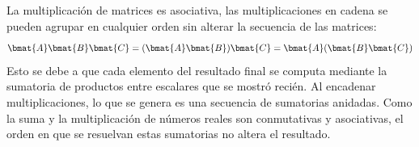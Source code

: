 La multiplicación de matrices es asociativa, las multiplicaciones en cadena se pueden agrupar en cualquier orden sin alterar la secuencia de las matrices:
\[\bmat{A}  \bmat{B}  \bmat{C} = (\bmat{A}  \bmat{B})  \bmat{C} = \bmat{A}  (\bmat{B}  \bmat{C})\]
Esto se debe a que cada elemento del resultado final se computa mediante la sumatoria de productos entre escalares que se mostró recién. Al encadenar multiplicaciones, lo que se genera es una secuencia de sumatorias anidadas. Como la suma y la multiplicación de números reales son conmutativas y asociativas, el orden en que se resuelvan estas sumatorias no altera el resultado.
